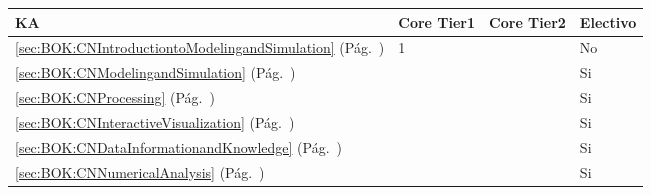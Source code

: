 \begin{center}
\begin{tabularx}{\textwidth}{|X|p{1cm}|p{1cm}|p{1.4cm}|}\hline
\textbf{\acf{KA}} & \textbf{Core Tier1} & \textbf{Core Tier2} & \textbf{Electivo} \\ \hline
\ref{sec:BOK:CNIntroductiontoModelingandSimulation} \htmlref{\CNIntroductiontoModelingandSimulation}{sec:BOK:CNIntroductiontoModelingandSimulation}\xspace (Pág.~\pageref{sec:BOK:CNIntroductiontoModelingandSimulation}) & 1 & ~ & No \\ \hline
\ref{sec:BOK:CNModelingandSimulation} \htmlref{\CNModelingandSimulation}{sec:BOK:CNModelingandSimulation}\xspace (Pág.~\pageref{sec:BOK:CNModelingandSimulation}) & ~ & ~ & Si \\ \hline
\ref{sec:BOK:CNProcessing} \htmlref{\CNProcessing}{sec:BOK:CNProcessing}\xspace (Pág.~\pageref{sec:BOK:CNProcessing}) & ~ & ~ & Si \\ \hline
\ref{sec:BOK:CNInteractiveVisualization} \htmlref{\CNInteractiveVisualization}{sec:BOK:CNInteractiveVisualization}\xspace (Pág.~\pageref{sec:BOK:CNInteractiveVisualization}) & ~ & ~ & Si \\ \hline
\ref{sec:BOK:CNDataInformationandKnowledge} \htmlref{\CNDataInformationandKnowledge}{sec:BOK:CNDataInformationandKnowledge}\xspace (Pág.~\pageref{sec:BOK:CNDataInformationandKnowledge}) & ~ & ~ & Si \\ \hline
\ref{sec:BOK:CNNumericalAnalysis} \htmlref{\CNNumericalAnalysis}{sec:BOK:CNNumericalAnalysis}\xspace (Pág.~\pageref{sec:BOK:CNNumericalAnalysis}) & ~ & ~ & Si \\ \hline
\end{tabularx}
\end{center}
